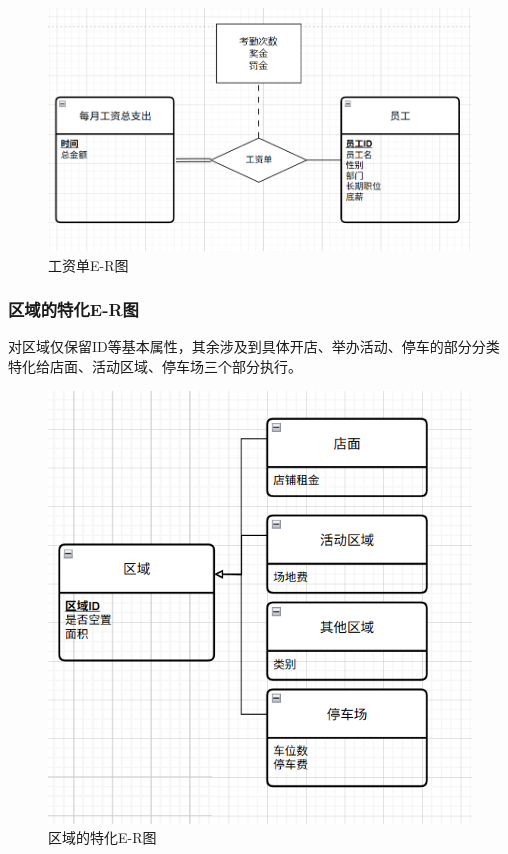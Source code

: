 \documentclass[]{article}
\let\oldincludegraphics\includegraphics
\renewcommand{\includegraphics}[2][]{%
  \begin{center}\oldincludegraphics[#1]{#2}\end{center}%
}
\begin{document}
\begin{figure}[htbp]
\centering
\includegraphics{image12.png}
\caption{工资单E-R图}
\end{figure}

\hypertarget{ux533aux57dfux7684ux7279ux5316e-rux56fe}{%
\subsubsection{区域的特化E-R图}\label{ux533aux57dfux7684ux7279ux5316e-rux56fe}}

对区域仅保留ID等基本属性，其余涉及到具体开店、举办活动、停车的部分分类特化给店面、活动区域、停车场三个部分执行。

\begin{figure}[htbp]
\centering
\includegraphics{image13.png}
\caption{区域的特化E-R图}
\end{figure}
\end{document}
